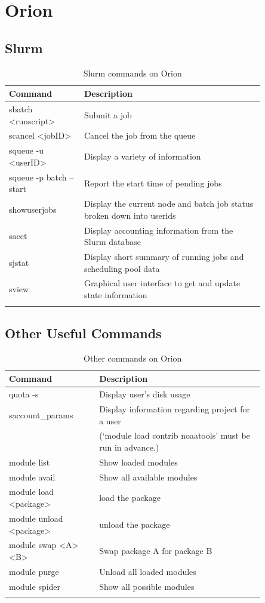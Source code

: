 \documentclass[11pt,fleqn]{report}              %
\begin{document}
\section{Orion}

\subsection{Slurm}
{
\fontsize{10}{12}\selectfont
\begin{longtable}{ p{0.25\linewidth} | p{0.6\linewidth} }
\hline
\hline
 Command & Description \\
\hline
 sbatch <runscript> & Submit a job  \\
 scancel <jobID> & Cancel the job from the queue \\
 squeue -u <userID> & Display a variety of information \\
 squeue -p batch --start & Report the start time of pending jobs \\
 showuserjobs & Display the current node and batch job status broken down into userids\\ 
 sacct & Display accounting information from the Slurm database \\
 sjstat & Display short summary of running jobs and scheduling pool data \\
 sview & Graphical user interface to get and update state information \\
\hline
\caption{Slurm commands on Orion}
\label{table:command_slurm_orion}
\end{longtable}
}


\subsection{Other Useful Commands}

{
\fontsize{10}{12}\selectfont
\begin{longtable}{p{0.3\linewidth} | p{0.55\linewidth} }
\hline
\hline
 Command & Description \\
\hline
 quota -s & Display user's disk usage  \\
 saccount\_params & Display information regarding project for a user \\
 & (`module load contrib noaatools' must be run in advance.) \\
 module list & Show loaded modules \\
 module avail & Show all available modules \\
 module load <package> & load the package \\
 module unload <package> & unload the package \\
 module swap <A> <B> & Swap package A for package B \\
 module purge & Unload all loaded modules \\
 module spider & Show all possible modules \\
\hline
\caption{Other commands on Orion}
\label{table:command_orion_others}
\end{longtable}
}
\end{document}
